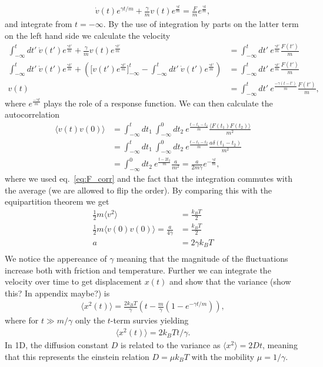 \begin{align*}
  \dot{ v}(t)e^{\gamma t /m} + \frac{\gamma}{m} v(t)e^{\frac{\gamma t}{m}}  = \frac{ F}{m}e^{\frac{\gamma t}{m}},
\end{align*}
and integrate from $t = -\infty$. By the use of integration by parts on the latter term on the left hand side we calculate the velocity 
\begin{align*}
  \int_{-\infty}^t dt' \ \dot{ v}(t')e^{\frac{\gamma t'}{m}} + \frac{\gamma}{m} v(t)e^{\frac{\gamma t'}{m}} &=  \int_{-\infty}^t dt' \ e^{\frac{\gamma t'}{m}} \frac{ F(t')}{m}  \\
  \int_{-\infty}^t dt' \ \dot{ v}(t')e^{\frac{\gamma t'}{m}} + \left(\Big[ v(t')e^{\frac{\gamma t'}{m}}\Big]_{-\infty}^t - \int_{-\infty}^t dt' \ \dot{ v}(t')e^{\frac{\gamma t'}{m}}\right) &= \int_{-\infty}^t dt' \ e^{\frac{\gamma t'}{m}} \frac{ F(t')}{m}  \\
   v(t) &= \int_{-\infty}^t dt' \ e^{\frac{-\gamma(t - t')}{m}} \frac{ F(t')}{m},
\end{align*}
where $e^{\frac{-\gamma t}{m}}$ plays the role of a response function. We can then calculate the autocorrelation 
\begin{align*}
  \big\langle  v(t) v(0) \big\rangle &= \int_{-\infty}^t dt_1 \ \int_{-\infty}^0 dt_2 \ e^{\frac{t - t_1 - t_2}{m}} \frac{\langle  F(t_1)  F(t_2) \rangle}{m^2} \\
  &= \int_{-\infty}^t dt_1 \ \int_{-\infty}^0 dt_2 \ e^{\frac{t - t_1 - t_2}{m}} \frac{a \delta(t_1 - t_2)}{m^2} \\
  &= \int_{-\infty}^0 dt_2 \ e^{\frac{t - 2t_2}{m}} \frac{a}{m^2} = \frac{a}{2m\gamma}e^{-\frac{\gamma t}{m}},
\end{align*}
where we used eq.~\eqref{eq:F_corr} and the fact that the integration commutes with the average (we are allowed to flip the order). By comparing this with the equipartition theorem we get 
\begin{align*}
  \frac{1}{2}m\langle  v^2 \rangle &= \frac{k_BT}{2} \\
  \frac{1}{2}m\langle  v(0) v(0) \rangle = \frac{a}{4\gamma} &= \frac{k_BT}{2} \\
  a &=  2\gamma k_B T \\
\end{align*}
We notice the appereance of $\gamma$ meaning that the magnitude of the fluctuations increase both with friction and temperature. Further we can integrate the velocity over time to get displacement $x(t)$ and show that the variance (show this? In appendix maybe?) is 
\begin{align*}
  \big\langle x^2(t) \big\rangle = \frac{2 k_B T}{\gamma} \left(t - \frac{m}{\gamma}\left(1 - e^{-\gamma t/m} \right) \right),
\end{align*}
where for $t \gg m/\gamma$ only the $t$-term survies yielding
\begin{align*}
  \langle x^2(t) \rangle = 2 k_BTt/\gamma.
\end{align*}
In 1D, the diffusion constant $D$ is related to the variance as $\langle x^2 \rangle = 2Dt$, meaning that this represents the einstein relation $D = \mu k_B T$ with the mobility $\mu = 1/\gamma$.

